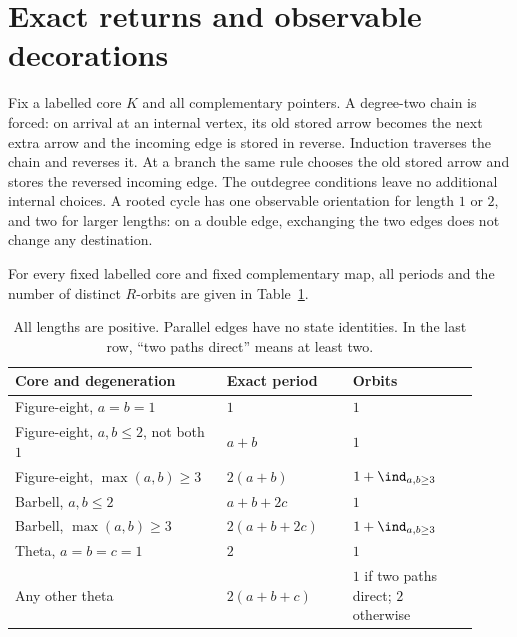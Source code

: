 \section{Exact returns and observable decorations}
Fix a labelled core $K$ and all complementary pointers. A degree-two chain
is forced: on arrival at an internal vertex, its old stored arrow becomes
the next extra arrow and the incoming edge is stored in reverse. Induction
traverses the chain and reverses it. At a branch the same rule chooses the
old stored arrow and stores the reversed incoming edge. The outdegree
conditions leave no additional internal choices. A rooted cycle has one
observable orientation for length $1$ or $2$, and two for larger lengths:
on a double edge, exchanging the two edges does not change any destination.

\begin{theorem}\label{thm:table}
For every fixed labelled core and fixed complementary map, all periods and
the number of distinct $R$-orbits are given in Table~\ref{tab:periods}.
\end{theorem}
\begin{table}[t]
\centering\small
\begin{tabular}{@{}p{0.42\linewidth}p{0.25\linewidth}p{0.25\linewidth}@{}}
\hline
Core and degeneration & Exact period & Orbits\\
\hline
Figure-eight, $a=b=1$ & $1$ & $1$\\
Figure-eight, $a,b\le2$, not both $1$ & $a+b$ & $1$\\
Figure-eight, $\max(a,b)\ge3$ & $2(a+b)$ & $1+\ind_{a,b\ge3}$\\
Barbell, $a,b\le2$ & $a+b+2c$ & $1$\\
Barbell, $\max(a,b)\ge3$ & $2(a+b+2c)$ & $1+\ind_{a,b\ge3}$\\
Theta, $a=b=c=1$ & $2$ & $1$\\
Any other theta & $2(a+b+c)$ & $1$ if two paths direct; $2$ otherwise\\
\hline
\end{tabular}
\caption{All lengths are positive. Parallel edges have no state identities.
In the last row, ``two paths direct'' means at least two.}
\label{tab:periods}
\end{table}
